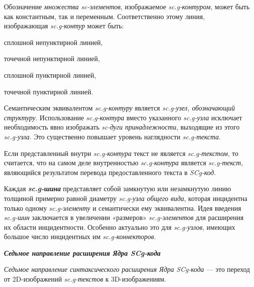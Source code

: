 Обозначение \textit{множества sc-элементов}, изображаемое \textit{sc.g-контуром}, может быть как константным, так и переменным. Соответственно этому линия, изображающая \textit{sc.g-контур} может быть: 

\begin{textitemize}
	\item сплошной непунктирной линией,
	\item точечной непунктирной линией,
	\item сплошной пунктирной линией,
	\item точечной пунктирной линией.
\end{textitemize}

\bigskip
Семантическим эквивалентом \textit{sc.g-контуру} является \textit{sc.g-узел, обозначающий структуру}. Использование \textit{sc.g-контура} вместо указанного \textit{sc.g-узла} исключает необходимость явно изображать \textit{sc-дуги принадлежности}, выходящие из этого \textit{sc.g-узла}. Это существенно повышает уровень наглядности \textit{sc.g-текста}.

Если представленный внутри \textit{sc.g-контура} текст не является \textit{sc.g-текстом}, то считается, что на самом деле внутренностью \textit{sc.g-контура} является \textit{sc.g-текст}, являющийся результатом перевода предоставленного текста в \textit{SCg-код}.

Каждая \textbf{\textit{sc.g-шина}} представляет собой замкнутую или незамкнутую линию толщиной примерно равной диаметру \textit{sc.g-узла общего вида}, которая инцидентна только одному \textit{sc.g-элементу} и семантически ему эквивалентна. Идея введения \textit{sc.g-шин} заключается в увеличении «размеров» \textit{sc.g-элементов} для расширения их области инцидентности. Особенно актуально это для \textit{sc.g-узлов}, имеющих большое число инцидентных им \textit{sc.g-коннекторов}.

\bigskip
\textbf{\textit{Седьмое направление расширения Ядра SCg-кода}}
	
\textit{Седьмое направление синтаксического расширения Ядра SCg-кода} --- это переход от 2D-изображений \textit{sc.g-текстов} к 3D-изображениям.

